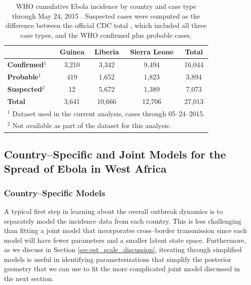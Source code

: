 \begin{table}[htbp]
	\caption[Ebola incidence by country and case type]{WHO cumulative Ebola incidence by country and case type through May 24, 2015 \cite{who2016eboladat}. Suspected cases were computed as the difference between the official CDC total \cite{cdc2016eboladat}, which included all three case types, and the WHO confirmed plus probable cases.}
	\label{tab:ebola_descriptives}
	\small
	\centering
	\begin{tabular}{lcccc}	
		\hline	
		& \textbf{Guinea} & \textbf{Liberia} & \textbf{Sierra Leone} & \textbf{Total} \\\hline
		\textbf{Confirmed}$ ^1 $ & 3,210 & 3,342 & 9,494 & 16,044\\ 
		\textbf{Probable}$ ^1 $ & 419 & 1,652 & 1,823 & 3,894 \\
		\textbf{Suspected$ ^2 $} & 12 & 5,672 & 1,389 & 7,073 \\
		\hline
		\textbf{Total} & 3,641 & 10,666 & 12,706 & 27,013 \\
		\hline
		\multicolumn{5}{l}{\scriptsize $ ^1 $ Dataset used in the current analysis, cases through 05--24--2015.}\\
		\multicolumn{5}{l}{\scriptsize $ ^2 $ Not available as part of the dataset for this analysis.}\\
	\end{tabular} 
\end{table}

\subsection{Country--Specific and Joint Models for the Spread of Ebola in West Africa}
\label{subsec:ebola_models}

\subsubsection{Country--Specific Models}
\label{subsubsec:ebola_single_models}
A typical first step in learning about the overall outbreak dynamics is to separately model the incidence data from each country. This is less challenging than fitting a joint model that incorporates cross--border transmission since each model will have fewer parameters and a smaller latent state space. Furthermore, as we discuss in Section \ref{sec:est_scale_discussion}, iterating through simplified models is useful in identifying parameterizations that simplify the posterior geometry that we can use to fit the more complicated joint model discussed in the next section. 

